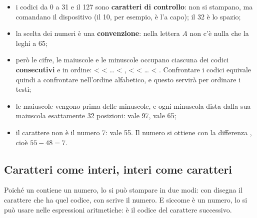 \begin{itemize}
  \item i codici da 0 a 31 e il 127 sono \textbf{caratteri di controllo}:
        non si stampano, ma comandano il dispositivo (il 10, per esempio, è
        l'a capo); il 32 è lo spazio;
  \item la scelta dei numeri è una \textbf{convenzione}: nella lettera
        \textit{A} non c'è nulla che la leghi a 65;
  \item però le cifre, le maiuscole e le minuscole occupano ciascuna dei
        codici \textbf{consecutivi} e in ordine:  <  <
        \dots{} < ,  <  < \dots{} <
        . Confrontare i codici equivale quindi a confrontare
        nell'ordine alfabetico, e questo servirà per ordinare i testi;
  \item le maiuscole vengono prima delle minuscole, e ogni minuscola dista
        dalla sua maiuscola esattamente 32 posizioni:  vale 97,
         vale 65;
  \item il carattere  non è il numero 7: vale 55. Il numero si
        ottiene con la differenza , cioè $55 - 48 = 7$.
\end{itemize}


\subsection{Caratteri come interi, interi come caratteri}

Poiché un  contiene un numero, lo si può stampare in due modi:
con   disegna il carattere che ha quel codice, con
 scrive il numero. E siccome è un numero, lo si può usare nelle
espressioni aritmetiche:  è il codice del carattere successivo.

